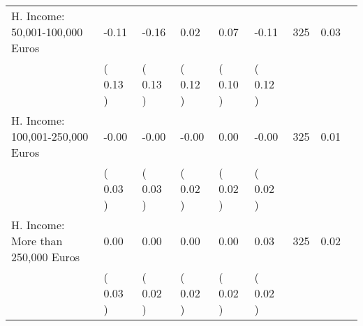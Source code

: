 \begin{tabular}{L{6.2cm} C{1.8cm} C{1.8cm} C{1.8cm} C{1.8cm} C{1.8cm} C{1.8cm} C{0.3cm} C{0.3cm}}
H. Income: 50,001-100,000 Euros &     -0.11 &     -0.16 &      0.02 &      0.07 &     -0.11  & 325 &       0.03 \\ 
 & (     0.13 ) & (     0.13 ) & (     0.12 ) & (     0.10 ) & (     0.12 )  & \\
H. Income: 100,001-250,000 Euros &     -0.00 &     -0.00 &     -0.00 &      0.00 &     -0.00  & 325 &       0.01 \\ 
 & (     0.03 ) & (     0.03 ) & (     0.02 ) & (     0.02 ) & (     0.02 )  & \\
H. Income: More than 250,000 Euros &      0.00 &      0.00 &      0.00 &      0.00 &      0.03  & 325 &       0.02 \\ 
 & (     0.03 ) & (     0.02 ) & (     0.02 ) & (     0.02 ) & (     0.02 )  & \\
\bottomrule
\end{tabular}
